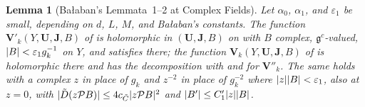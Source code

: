 \documentclass[11pt]{preprint}
\DeclarePairedDelimiter{\abs}{\lvert}{\rvert}
\numberwithin{equation}{section}
\newtheorem{lemma}{Lemma}[section]
\theoremstyle{definition}
\theoremstyle{remark}
\theoremstyle{plain}
\begin{document}
\begin{lemma}[Ba{\l}aban's Lemmata~1--2 at Complex Fields]\label{lem:rg2-complex}
Let $\alpha_0$, $\alpha_1$, and $\varepsilon_1$ be small, depending on $d$, $L$, $M$, and Ba{\l}aban's constants. The function $\mathbf V'_k(Y, \mathbf U, \mathbf J, B)$ of \cite[Lemma~1, p.~9]{BalabanRG2} is holomorphic in $(\mathbf U, \mathbf J, B)$ on \cite[(1.34)]{BalabanRG2} with $B$ complex, $\mathfrak g^c$-valued, $\abs B < \varepsilon_1g_k^{-1}$ on $Y$, and satisfies \cite[(1.36)]{BalabanRG2} there; the function $\mathbf V_k(Y, \mathbf U, \mathbf J, B)$ of \cite[Lemma~2, p.~11]{BalabanRG2} is holomorphic there and has the decomposition \cite[(1.42)]{BalabanRG2} with \cite[(1.43)]{BalabanRG2} and \cite[(1.36)]{BalabanRG2} for $\mathbf V''_k$. The same holds with a complex $z$ in place of $g_k$ and $z^{-2}$ in place of $g_k^{-2}$ where $\abs z\abs B < \varepsilon_1$, also at $z = 0$, with $\abs{\tilde D(z\mathcal PB)} \leq 4c_{\tilde C}\abs{z\mathcal PB}^2$ and $\abs{B'} \leq C'_1\abs z\abs B$.
\end{lemma}
\end{document}
